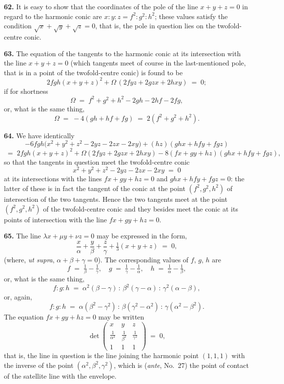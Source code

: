 \documentclass[11pt,a4paper]{article}
\begin{document}
\medskip

\textbf{62.} It is easy to show that the coordinates of the pole of the line $x+y+z=0$ in regard to the harmonic conic are $x:y:z = f^{2}:g^{2}:h^{2}$; these values satisfy the condition $\sqrt{x}+\sqrt{y}+\sqrt{z}=0$, that is, the pole in question lies on the twofold-centre conic.

\medskip

\textbf{63.} The equation of the tangents to the harmonic conic at its intersection with the line $x+y+z=0$ (which tangents meet of course in the last-mentioned pole, that is in a point of the twofold-centre conic) is found to be
\[
2 f g h (x+y+z)^{2} + \Omega\,(2 f y z + 2 g z x + 2 h x y) \;=\; 0;
\]
if for shortness
\[
\Omega \;=\; f^{2}+g^{2}+h^{2}-2gh-2hf-2fg,
\]
or, what is the same thing,
\[
\Omega \;=\; -4(gh + hf + fg) \;=\; 2(f^{2}+g^{2}+h^{2}).
\]

\medskip

\textbf{64.} We have identically
\[
-6 f g h\bigl(x^{2}+y^{2}+z^{2}-2yz-2zx-2xy\bigr) + (h z)(g h x + h f y + f g z)
\]
\[
\;=\; 2 f g h(x+y+z)^{2} + \Omega(2 f y z + 2 g z x + 2 h x y) - 8(f x + g y + h z)(g h x + h f y + f g z),
\]
so that the tangents in question meet the twofold-centre conic
\[
x^{2}+y^{2}+z^{2}-2yz-2zx-2xy \;=\; 0
\]
at its intersections with the lines $f x + g y + h z = 0$ and $g h x + h f y + f g z = 0$: the latter of these is in fact the tangent of the conic at the point $(f^{2},g^{2},h^{2})$ of intersection of the two tangents. Hence the two tangents meet at the point $(f^{2},g^{2},h^{2})$ of the twofold-centre conic and they besides meet the conic at its points of intersection with the line $f x + g y + h z = 0$.

\medskip

\textbf{65.} The line $\lambda x + \mu y + \nu z = 0$ may be expressed in the form,
\[
\frac{x}{\alpha} + \frac{y}{\beta} + \frac{z}{\gamma} + \tfrac{1}{3}(x+y+z) \;=\; 0,
\]
(where, \emph{ut supra}, $\alpha+\beta+\gamma=0$). The corresponding values of $f$, $g$, $h$ are
\[
f \;=\; \tfrac{1}{\beta}-\tfrac{1}{\gamma},\quad g \;=\; \tfrac{1}{\gamma}-\tfrac{1}{\alpha},\quad h \;=\; \tfrac{1}{\alpha}-\tfrac{1}{\beta},
\]
or, what is the same thing,
\[
f:g:h \;=\; \alpha^{2}(\beta-\gamma) \,:\, \beta^{2}(\gamma-\alpha) \,:\, \gamma^{2}(\alpha-\beta),
\]
or, again,
\[
f:g:h \;=\; \alpha(\beta^{2}-\gamma^{2}) \,:\, \beta(\gamma^{2}-\alpha^{2}) \,:\, \gamma(\alpha^{2}-\beta^{2}).
\]
The equation $f x + g y + h z = 0$ may be written
\[
\det\begin{pmatrix} x & y & z \\ \tfrac{1}{\alpha^{2}} & \tfrac{1}{\beta^{2}} & \tfrac{1}{\gamma^{2}} \\ 1 & 1 & 1 \end{pmatrix} \;=\; 0,
\]
that is, the line in question is the line joining the harmonic point $(1,1,1)$ with the inverse of the point $(\alpha^{2},\beta^{2},\gamma^{2})$, which is (\emph{ante}, No.~27) the point of contact of the satellite line with the envelope.
\end{document}
